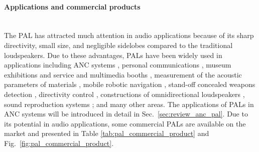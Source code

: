 \paragraph{Applications and commercial products}\mbox{}\\
The PAL has attracted much attention in audio applications because of its sharp directivity, small size, and negligible sidelobes compared to the traditional loudspeakers.
Due to these advantages, PALs have been widely used in applications including ANC systems \cite{Tanaka2010ActiveNoiseControl, Tanaka2011MathematicallyTrivialControl, Tanaka2014MultichannelActiveNoise, Tanaka2017BinauralActiveNoise}, 
personal communications \cite{Nakashima2005PrototypeParametricArray}, 
museum exhibitions and service and multimedia booths \cite{Kortbek2008CommunicatingArtInteractive}, 
measurement of the acoustic parameters of materials \cite{Castagnede2006ReflectionTransmissionNormal, Castagnede2008LowFrequencySitu}, 
mobile robotic navigation \cite{Skinner2019DemonstrationLengthLimited},
stand-off concealed weapons detection \cite{Rudd2008SimulationIncidentNonlinear},
directivity control \cite{Shi2014OverviewDirectivityControl}, 
constructions of omnidirectional loudspeakers \cite{Arnela2018ConstructionOmnidirectionalParametric, Arnela2021CharacterizationOmnidirectionalParametric},
sound reproduction systems \cite{Alunno2017DirectionalLandscapesUsing};
and many other areas.
The applications of PALs in ANC systems will be introduced in detail in Sec.~\ref{sec:review_anc_pal}.
{Due to its potential in audio applications, some commercial PALs are available on the market and presented in Table \ref{tab:pal_commercial_product} and Fig.~\ref{fig:pal_commercial_product}.
}

